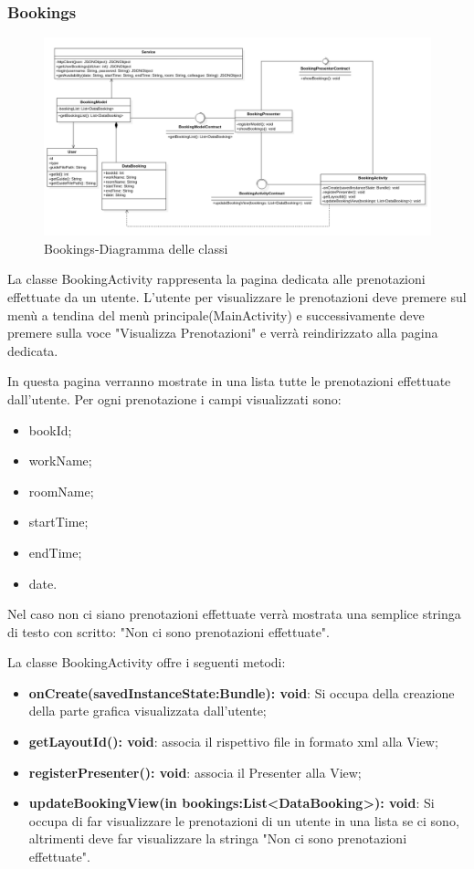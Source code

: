\subsubsection{Bookings}
\begin{figure}[H]
	\centering
	\includegraphics[width=16cm]{res/images/BookingsClass.png}
	\caption{Bookings-Diagramma delle classi}
	\label{fig:Bookings-Diagramma delle classi}
\end{figure}
La classe BookingActivity rappresenta la pagina dedicata alle prenotazioni effettuate da un utente. L'utente per visualizzare le prenotazioni deve premere sul menù a tendina del menù principale(MainActivity) e successivamente deve premere sulla voce "Visualizza Prenotazioni" e verrà reindirizzato alla pagina dedicata.

In questa pagina verranno mostrate in una lista tutte le prenotazioni effettuate dall'utente. Per ogni prenotazione i campi visualizzati sono: 
\begin{itemize}
	\item bookId; 
	\item workName; 
	\item roomName; 
	\item startTime; 
	\item endTime; 
	\item date. 
\end{itemize}
Nel caso non ci siano prenotazioni effettuate verrà mostrata una semplice stringa di testo con scritto: "Non ci sono prenotazioni effettuate".

La classe BookingActivity offre i seguenti metodi:
\begin{itemize}
	\item \textbf{onCreate(savedInstanceState:Bundle): void}: Si occupa della creazione della parte grafica visualizzata dall'utente; 
	\item \textbf{getLayoutId(): void}: associa il rispettivo file in formato xml alla View;
	\item \textbf{registerPresenter(): void}: associa il Presenter alla View;
	\item \textbf{updateBookingView(in bookings:List<DataBooking>): void}: Si occupa di far visualizzare le prenotazioni di un utente in una lista se ci sono, altrimenti deve far visualizzare la stringa "Non ci sono prenotazioni effettuate".
\end{itemize}

